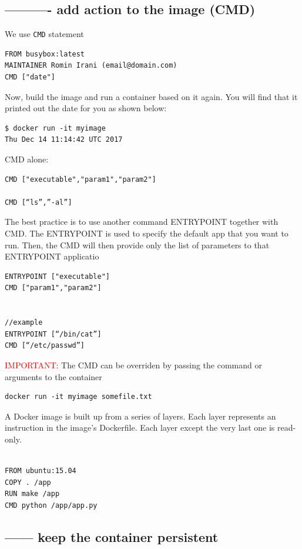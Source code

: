\subsection{---------- add action to the image (CMD)}


We use \verb!CMD! statement
\begin{verbatim}
FROM busybox:latest
MAINTAINER Romin Irani (email@domain.com)
CMD ["date"]
\end{verbatim}
Now, build the image and run a container based on it again. You will find that it printed out the date for you as shown below:
\begin{verbatim}
$ docker run -it myimage
Thu Dec 14 11:14:42 UTC 2017
\end{verbatim}

CMD alone:
\begin{verbatim}
CMD ["executable","param1","param2"]

CMD [“ls”,”-al”] 
\end{verbatim}

 The best practice is to use another command ENTRYPOINT together with CMD.
 The ENTRYPOINT is used to specify the default app that you want to run. Then,
 the CMD will then provide only the list of parameters to that ENTRYPOINT applicatio

\begin{verbatim}
ENTRYPOINT ["executable"]
CMD ["param1","param2"]


//example
ENTRYPOINT [“/bin/cat”]
CMD [“/etc/passwd”]
\end{verbatim} 

\textcolor{red}{IMPORTANT}: The CMD can be overriden by passing the command or arguments to the container
\begin{verbatim}
docker run -it myimage somefile.txt
\end{verbatim}


A Docker image is built up from a series of layers.
Each layer represents an instruction in the image’s Dockerfile.
Each layer except the very last one is read-only.
\begin{verbatim}

FROM ubuntu:15.04
COPY . /app
RUN make /app
CMD python /app/app.py
\end{verbatim} 





\subsection{------ keep the container persistent}

